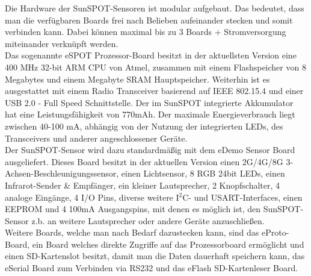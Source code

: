 Die Hardware der SunSPOT-Sensoren ist modular aufgebaut. Das bedeutet, dass man die verfügbaren Boards frei nach Belieben aufeinander stecken und somit verbinden kann. Dabei können maximal bis zu 3 Boards + Stromversorgung miteinander verknüpft werden. \cite{d:horan} \\

Das sogenannte eSPOT Prozessor-Board besitzt in der aktuellsten Version eine 400 MHz 32-bit ARM CPU von Atmel, zusammen mit einem Flashspeicher von 8 Megabytes und einem Megabyte SRAM Hauptspeicher. Weiterhin ist es ausgestattet mit einem Radio Transceiver basierend auf IEEE 802.15.4 und einer USB 2.0 - Full Speed Schnittstelle. Der im SunSPOT integrierte Akkumulator hat eine Leistungsfähigkeit von 770mAh. Der maximale Energieverbrauch liegt zwischen 40-100 mA, abhängig von der Nutzung der integrierten LEDs, des Transceivers und anderer angeschlossener Geräte. \cite{d:horan} \cite{d:spotmain} \\

Der SunSPOT-Sensor wird dazu standardmäßig mit dem eDemo Sensor Board ausgeliefert. Dieses Board besitzt in der aktuellen Version einen 2G/4G/8G 3-Achsen-Beschleunigungssensor, einen Lichtsensor, 8 RGB 24bit LEDs, einen Infrarot-Sender \& Empfänger, ein kleiner Lautsprecher, 2 Knopfschalter, 4 analoge Eingänge, 4 I/O Pins, diverse weitere I$^2$C- und USART-Interfaces, einen EEPROM und 4 100mA Ausgangspins, mit denen es möglich ist, den SunSPOT-Sensor z.b. an weitere Lautsprecher oder andere Geräte anzuschließen. \cite{d:horan} \cite{d:spotdemo} \\

Weitere Boards, welche man nach Bedarf dazustecken kann, sind das eProto-Board, ein Board welches direkte Zugriffe auf das Prozessorboard ermöglicht und einen SD-Kartenslot besitzt, damit man die Daten dauerhaft speichern kann, das eSerial Board zum Verbinden via RS232 und das eFlash SD-Kartenleser Board. \cite{d:horan} \\

 
